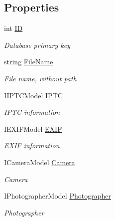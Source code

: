 \subsection*{Properties}
\begin{DoxyCompactItemize}
\item 
int \mbox{\hyperlink{class_pic_d_b_1_1_models_1_1_picture_model_a534920b39400aed29cff8e46d16f0643}{ID}}
\begin{DoxyCompactList}\small\item\em Database primary key \end{DoxyCompactList}\item 
string \mbox{\hyperlink{class_pic_d_b_1_1_models_1_1_picture_model_a1d64b84ae4e891844d1c2314f4addb62}{File\+Name}}
\begin{DoxyCompactList}\small\item\em File name, without path \end{DoxyCompactList}\item 
I\+I\+P\+T\+C\+Model \mbox{\hyperlink{class_pic_d_b_1_1_models_1_1_picture_model_a319a31a1a28094a01dcd9ab545379515}{I\+P\+TC}}
\begin{DoxyCompactList}\small\item\em I\+P\+TC information \end{DoxyCompactList}\item 
I\+E\+X\+I\+F\+Model \mbox{\hyperlink{class_pic_d_b_1_1_models_1_1_picture_model_ae00785dc8fb8389d83a6c46b9da12e32}{E\+X\+IF}}
\begin{DoxyCompactList}\small\item\em E\+X\+IF information \end{DoxyCompactList}\item 
I\+Camera\+Model \mbox{\hyperlink{class_pic_d_b_1_1_models_1_1_picture_model_a4b60e66ebee631a702fa5a9c833939af}{Camera}}
\begin{DoxyCompactList}\small\item\em Camera \end{DoxyCompactList}\item 
I\+Photographer\+Model \mbox{\hyperlink{class_pic_d_b_1_1_models_1_1_picture_model_a57d74f8c86b80c2c9ddf34d86138b897}{Photographer}}
\begin{DoxyCompactList}\small\item\em Photographer \end{DoxyCompactList}\end{DoxyCompactItemize}


